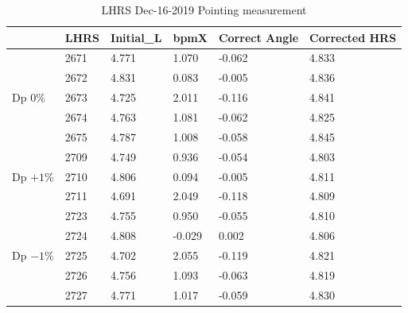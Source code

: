 \begin{table}[!ht]
    \caption{LHRS Dec-16-2019 Pointing measurement}
    \centering
    \begin{tabular}{|l|l|l|l|l|l|}
    \hline
        ~ & LHRS & Initial\_L & bpmX & Correct Angle & Corrected HRS \\ \hline
       \multirow{5}{5em}{Dp $0\%$} &  2671 & 4.771 & 1.070 & -0.062 & 4.833 \\  
        ~ & 2672 & 4.831 & 0.083 & -0.005 & 4.836 \\ 
        ~ & 2673 & 4.725 & 2.011 & -0.116 & 4.841 \\ 
        ~ & 2674 & 4.763 & 1.081 & -0.062 & 4.825 \\  
        ~ & 2675 & 4.787 & 1.008 & -0.058 & 4.845 \\ \hline
        \multirow{3}{5em}{ Dp $+1\%$} & 2709 & 4.749 & 0.936 & -0.054 & 4.803 \\ 
        ~ & 2710 & 4.806 & 0.094 & -0.005 & 4.811 \\  
        ~ & 2711 & 4.691 & 2.049 & -0.118 & 4.809 \\ \hline
        \multirow{5}{5em}{ Dp $-1\%$} & 2723 & 4.755 & 0.950 & -0.055 & 4.810 \\   
        ~ & 2724 & 4.808 & -0.029 & 0.002 & 4.806 \\  
        ~ & 2725 & 4.702 & 2.055 & -0.119 & 4.821 \\ 
        ~ & 2726 & 4.756 & 1.093 & -0.063 & 4.819 \\  
        ~ & 2727 & 4.771 & 1.017 & -0.059 & 4.830 \\ \hline
    \end{tabular}
    \label{table:crex_1_pointing_lhrs}
\end{table}


